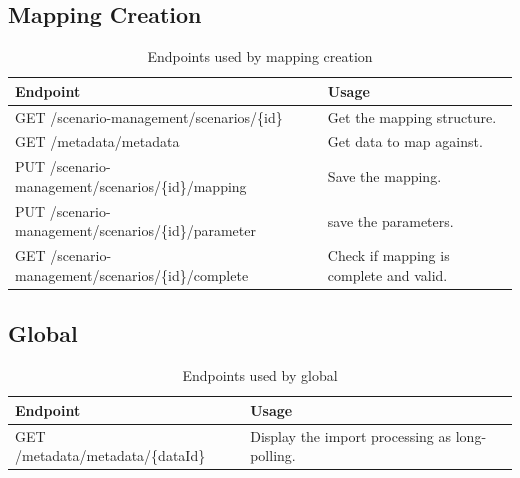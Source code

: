\subsection{Mapping Creation}
\begin{table}[H]
	\caption{Endpoints used by mapping creation}
	\begin{tabularx}{\textwidth}{|l|X|}
		\hline
		\textbf{Endpoint} & \textbf{Usage} \\ \hline
		GET /scenario-management/scenarios/\{id\} & Get the mapping structure. \\ \hline
		GET /metadata/metadata & Get data to map against. \\ \hline
		PUT /scenario-management/scenarios/\{id\}/mapping & Save the mapping. \\ \hline
		PUT /scenario-management/scenarios/\{id\}/parameter & save the parameters. \\ \hline
		GET /scenario-management/scenarios/\{id\}/complete & Check if mapping is complete and valid. \\ \hline
	\end{tabularx}
\end{table}


\subsection{Global}
\begin{table}[H]
	\caption{Endpoints used by global}
	\begin{tabularx}{\textwidth}{|l|X|}
		\hline
		\textbf{Endpoint} & \textbf{Usage} \\ \hline
		GET /metadata/metadata/\{dataId\} & Display the import processing as long-polling. \\ \hline
	\end{tabularx}
\end{table}
